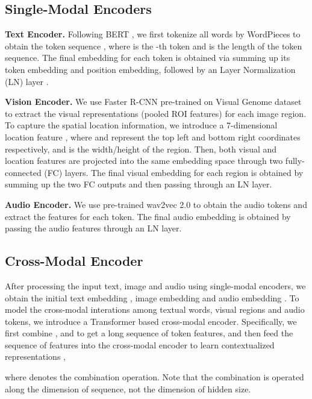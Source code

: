 \documentclass[10pt,twocolumn,letterpaper]{article}
\begin{document}
\subsection{Single-Modal Encoders}
\textbf{Text Encoder.} Following BERT \cite{bert}, we first tokenize all words by WordPieces \cite{johnson2017google} to obtain the token sequence , where  is the -th token and  is the length of the token sequence. The final embedding for each token is obtained via summing up its token embedding and position embedding, followed by an Layer Normalization (LN) layer \cite{ba2016layer}. 

\textbf{Vision Encoder.} We use Faster R-CNN \cite{ren2015faster} pre-trained on Visual Genome dataset \cite{krishna2017visual} to extract the visual representations (pooled ROI features) for each image region. To capture the spatial location information, we introduce a 7-dimensional location feature , where  and  represent the top left and bottom right coordinates respectively, and  is the width/height of the region. Then, both visual and location features are projected into the same embedding space through two fully-connected (FC) layers. The final visual embedding for each region is obtained by summing up the two FC outputs and then passing through an LN layer. 

\textbf{Audio Encoder.} We use pre-trained wav2vec 2.0 \cite{wav2vec} to obtain the audio tokens and extract the features for each token. The final audio embedding is obtained by passing the audio features through an LN layer.

\subsection{Cross-Modal Encoder}
After processing the input text, image and audio using single-modal encoders, we obtain the initial text embedding , image embedding  and audio embedding . To model the cross-modal interations among textual words, visual regions and audio tokens, we introduce a Transformer based cross-modal encoder. Specifically, we first combine ,  and  to get a long sequence of token features, and then feed the sequence of features into the cross-modal encoder to learn contextualized representations ,
 
where  denotes the combination operation. Note that the combination is operated along the dimension of sequence, not the dimension of hidden size.
\end{document}
